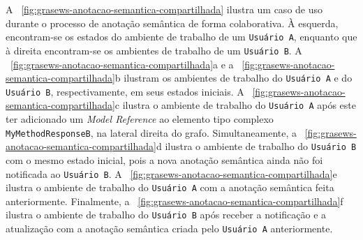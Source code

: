A \figurename~\ref{fig:grasews-anotacao-semantica-compartilhada} ilustra um caso de uso durante o processo de anotação semântica de forma colaborativa. À esquerda, encontram-se os estados do ambiente de trabalho de um \texttt{Usuário A}, enquanto que à direita encontram-se os ambientes de trabalho de um \texttt{Usuário B}. A \figurename~\ref{fig:grasews-anotacao-semantica-compartilhada}a e a \figurename~\ref{fig:grasews-anotacao-semantica-compartilhada}b ilustram os ambientes de trabalho do \texttt{Usuário A} e do \texttt{Usuário B}, respectivamente, em seus estados iniciais. A \figurename~\ref{fig:grasews-anotacao-semantica-compartilhada}c ilustra o ambiente de trabalho do \texttt{Usuário A} após este ter adicionado um \textit{Model Reference} ao elemento tipo complexo \texttt{MyMethodResponseB}, na lateral direita do grafo. Simultaneamente, a \figurename~\ref{fig:grasews-anotacao-semantica-compartilhada}d ilustra o ambiente de trabalho do \texttt{Usuário B} com o mesmo estado inicial, pois a nova anotação semântica ainda não foi notificada ao \texttt{Usuário B}. A \figurename~\ref{fig:grasews-anotacao-semantica-compartilhada}e ilustra o ambiente de trabalho do \texttt{Usuário A} com a anotação semântica feita anteriormente. Finalmente, a \figurename~\ref{fig:grasews-anotacao-semantica-compartilhada}f ilustra o ambiente de trabalho do \texttt{Usuário B} após receber a notificação e a atualização com a anotação semântica criada pelo \texttt{Usuário A} anteriormente.

